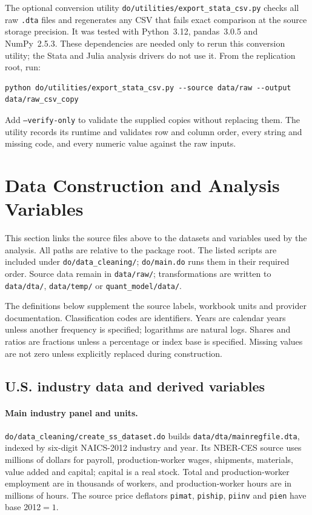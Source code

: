 \documentclass[11pt]{article}
\newcommand{\pkgfile}[1]{\nolinkurl{#1}}
\begin{document}
The optional conversion utility \pkgfile{do/utilities/export_stata_csv.py}
checks all raw \texttt{.dta} files and regenerates any CSV that fails exact
comparison at the source storage precision. It was tested with Python~3.12,
pandas~3.0.5 and NumPy~2.5.3. These dependencies are needed only to rerun this
conversion utility; the Stata and Julia analysis drivers do not use it.
From the replication root, run:
\begin{Verbatim}[fontsize=\small]
python do/utilities/export_stata_csv.py --source data/raw --output data/raw_csv_copy
\end{Verbatim}
Add \texttt{--verify-only} to validate the supplied copies without replacing
them. The utility records its runtime and validates row and column order,
every string and missing code, and every numeric value against the raw inputs.

\section{Data Construction and Analysis Variables}\label{sec:construction}

This section links the source files above to the datasets and variables
used by the analysis. All paths are relative to the package root.
The listed scripts are included under \pkgfile{do/data_cleaning/};
\pkgfile{do/main.do} runs them in their required order. Source data remain
in \pkgfile{data/raw/}; transformations are written to \pkgfile{data/dta/},
\pkgfile{data/temp/} or \pkgfile{quant_model/data/}.

The definitions below supplement the source labels, workbook units and
provider documentation. Classification codes are identifiers. Years are
calendar years unless another frequency is specified; logarithms are
natural logs. Shares and ratios are fractions unless a percentage or
index base is specified. Missing values are not zero unless explicitly
replaced during construction.

\subsection{U.S. industry data and derived variables}

\paragraph{Main industry panel and units.}
\pkgfile{do/data_cleaning/create_ss_dataset.do} builds
\pkgfile{data/dta/mainregfile.dta}, indexed by six-digit NAICS-2012 industry
and year. Its NBER-CES source uses millions of dollars for payroll,
production-worker wages, shipments, materials, value added and capital;
capital is a real stock. Total and production-worker employment are in
thousands of workers, and production-worker hours are in millions of hours.
The source price deflators \pkgfile{pimat}, \pkgfile{piship},
\pkgfile{piinv} and \pkgfile{pien} have base 2012$=1$.
\end{document}
